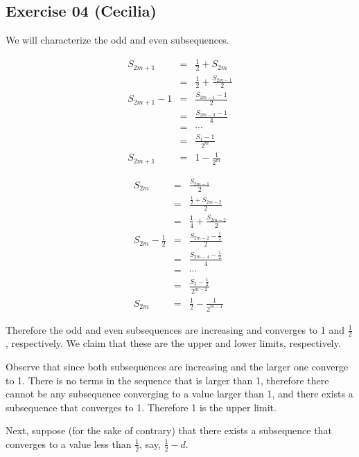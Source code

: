 \subsection*{Exercise 04 (Cecilia)}
We will characterize the odd and even subsequences.

\begin{eqnarray*}
      S_{2m + 1} &=& \frac{1}{2} + S_{2m}             \\
                 &=& \frac{1}{2} + \frac{S_{2m-1}}{2} \\
  S_{2m + 1} - 1 &=& \frac{S_{2m-1} - 1}{2}           \\
                 &=& \frac{S_{2m-3} - 1}{4}           \\
                 &=& \cdots                           \\
                 &=& \frac{S_1 - 1}{2^m}              \\
      S_{2m + 1} &=& 1 - \frac{1}{2^m}
\end{eqnarray*}

\begin{eqnarray*}
                S_{2m} &=& \frac{S_{2m-1}}{2}                \\
                       &=& \frac{\frac{1}{2} + S_{2m-2}}{2}  \\
                       &=& \frac{1}{4} + \frac{S_{2m-2}}{2}  \\
  S_{2m} - \frac{1}{2} &=& \frac{S_{2m-2} - \frac{1}{2}}{2}  \\
                       &=& \frac{S_{2m-4} - \frac{1}{2}}{4}  \\
                       &=& \cdots                            \\
                       &=& \frac{S_2 - \frac{1}{2}}{2^{m-2}} \\
                S_{2m} &=& \frac{1}{2} - \frac{1}{2^{m-1}}
\end{eqnarray*}

Therefore the odd and even subsequences are increasing and converges to 1 and $\frac{1}{2}$, respectively. We claim that these are the upper and lower limits, respectively.

Observe that since both subsequences are increasing and the larger one converge to 1. There is no terms in the sequence that is larger than 1, therefore there cannot be any subsequence converging to a value larger than 1, and there exists a subsequence that converges to 1. Therefore 1 is the upper limit.

Next, suppose (for the sake of contrary) that there exists a subsequence that converges to a value less than $\frac{1}{2}$, say, $ \frac{1}{2} - d $. 

